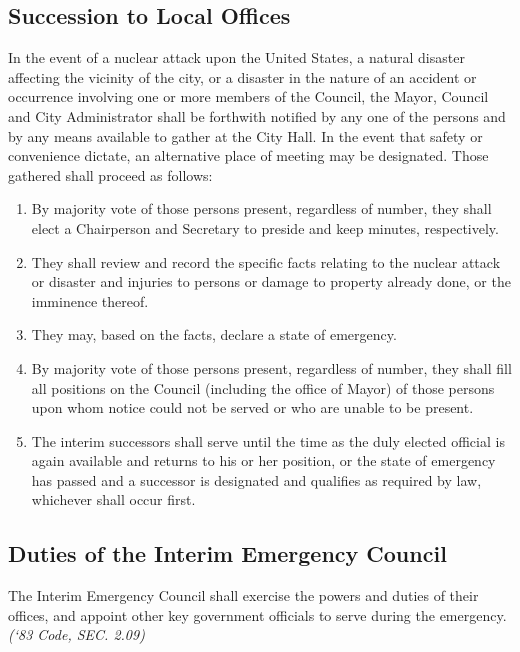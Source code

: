 \subsection{Succession to Local Offices}
In the event of a nuclear attack upon the United States, a natural disaster affecting the vicinity of the city, or a disaster in the nature of an accident or occurrence involving one or more members of the Council, the Mayor, Council and City Administrator shall be forthwith notified by any one of the persons and by any means available to gather at the City Hall.  In the event that safety or convenience dictate, an alternative place of meeting may be designated.  Those gathered shall proceed as follows:
\begin{enumerate}
    \item By majority vote of those persons present, regardless of number, they shall elect a Chairperson and Secretary to preside and keep minutes, respectively.
    \item They shall review and record the specific facts relating to the nuclear attack or disaster and injuries to persons or damage to property already done, or the imminence thereof.
    \item They may, based on the facts, declare a state of emergency.
    \item By majority vote of those persons present, regardless of number, they shall fill all positions on the Council (including the office of Mayor) of those persons upon whom notice could not be served or who are unable to be present.
    \item The interim successors shall serve until the time as the duly elected official is again available and returns to his or her position, or the state of emergency has passed and a successor is designated and qualifies as required by law, whichever shall occur first.
\end{enumerate}
\subsection{Duties of the Interim Emergency Council}
The Interim Emergency Council shall exercise the powers and duties of their offices, and appoint other key government officials to serve during the emergency.\newline
\emph{(‘83 Code, SEC. 2.09)}
